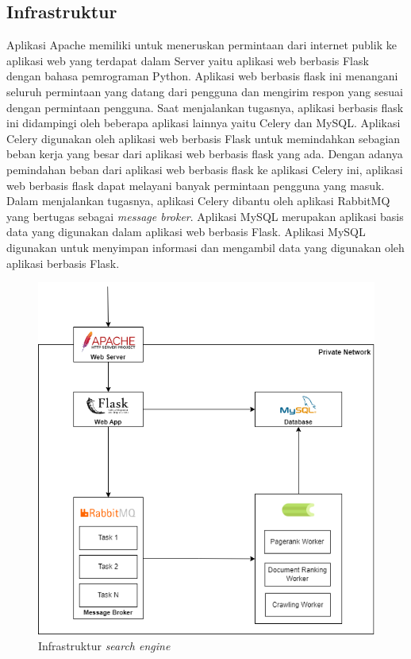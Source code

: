 \documentclass[
	a4paper, %
	10pt, %
	unnumberedsections, %
	twoside, %
]{LTJournalArticle}
\begin{document}
\subsection{Infrastruktur}
Aplikasi Apache memiliki untuk meneruskan permintaan dari internet publik ke aplikasi web yang terdapat dalam Server yaitu aplikasi web berbasis Flask dengan bahasa pemrograman Python. Aplikasi web berbasis flask ini menangani seluruh permintaan yang datang dari pengguna dan mengirim respon yang sesuai dengan permintaan pengguna. Saat menjalankan tugasnya, aplikasi berbasis flask ini didampingi oleh beberapa aplikasi lainnya yaitu Celery dan MySQL. Aplikasi Celery digunakan oleh aplikasi web berbasis Flask untuk memindahkan sebagian beban kerja yang besar dari aplikasi web berbasis flask yang ada. Dengan adanya pemindahan beban dari aplikasi web berbasis flask ke aplikasi Celery ini, aplikasi web berbasis flask dapat melayani banyak permintaan pengguna yang masuk. Dalam menjalankan tugasnya, aplikasi Celery dibantu oleh aplikasi RabbitMQ yang bertugas sebagai \textit{message broker}. Aplikasi MySQL merupakan aplikasi basis data yang digunakan dalam aplikasi web berbasis Flask. Aplikasi MySQL digunakan untuk menyimpan informasi dan mengambil data yang digunakan oleh aplikasi berbasis Flask.


\begin{figure}[H]
	\centering
	\includegraphics[width=\linewidth]{infra2.png}
	\caption{Infrastruktur \textit{search engine}}
\end{figure}
\end{document}
